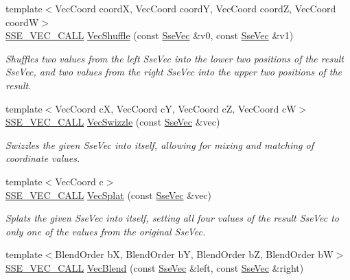 {\bf }\par
\begin{DoxyCompactItemize}
\item 
{\footnotesize template$<$Vec\+Coord coord\+X, Vec\+Coord coord\+Y, Vec\+Coord coord\+Z, Vec\+Coord coord\+W$>$ }\\\hyperlink{ssevec__math__defs_8h_a97454f977a5281455cecacce1e8ba670}{S\+S\+E\+\_\+\+V\+E\+C\+\_\+\+C\+A\+L\+L} \hyperlink{group___s_i_m_d_vec_math_gae8f78c3f4bb12afec4debb58bb9b9643}{Vec\+Shuffle} (const \hyperlink{namespacegfxmath_a0de2243e2b8d0fd46d3af5e036423004}{Sse\+Vec} \&v0, const \hyperlink{namespacegfxmath_a0de2243e2b8d0fd46d3af5e036423004}{Sse\+Vec} \&v1)
\begin{DoxyCompactList}\small\item\em Shuffles two values from the left Sse\+Vec into the lower two positions of the result Sse\+Vec, and two values from the right Sse\+Vec into the upper two positions of the result. \end{DoxyCompactList}\item 
{\footnotesize template$<$Vec\+Coord c\+X, Vec\+Coord c\+Y, Vec\+Coord c\+Z, Vec\+Coord c\+W$>$ }\\\hyperlink{ssevec__math__defs_8h_a97454f977a5281455cecacce1e8ba670}{S\+S\+E\+\_\+\+V\+E\+C\+\_\+\+C\+A\+L\+L} \hyperlink{group___s_i_m_d_vec_math_ga6a071d88e0f11c5a9f5b1283ed8f3ec2}{Vec\+Swizzle} (const \hyperlink{namespacegfxmath_a0de2243e2b8d0fd46d3af5e036423004}{Sse\+Vec} \&vec)
\begin{DoxyCompactList}\small\item\em Swizzles the given Sse\+Vec into itself, allowing for mixing and matching of coordinate values. \end{DoxyCompactList}\item 
{\footnotesize template$<$Vec\+Coord c$>$ }\\\hyperlink{ssevec__math__defs_8h_a97454f977a5281455cecacce1e8ba670}{S\+S\+E\+\_\+\+V\+E\+C\+\_\+\+C\+A\+L\+L} \hyperlink{group___s_i_m_d_vec_math_gae0bf083e25adfecef9647164299dc9be}{Vec\+Splat} (const \hyperlink{namespacegfxmath_a0de2243e2b8d0fd46d3af5e036423004}{Sse\+Vec} \&vec)
\begin{DoxyCompactList}\small\item\em Splats the given Sse\+Vec into itself, setting all four values of the result Sse\+Vec to only one of the values from the original Sse\+Vec. \end{DoxyCompactList}\item 
{\footnotesize template$<$Blend\+Order b\+X, Blend\+Order b\+Y, Blend\+Order b\+Z, Blend\+Order b\+W$>$ }\\\hyperlink{ssevec__math__defs_8h_a97454f977a5281455cecacce1e8ba670}{S\+S\+E\+\_\+\+V\+E\+C\+\_\+\+C\+A\+L\+L} \hyperlink{group___s_i_m_d_vec_math_gabd3f3903877408b4a856e06f97ef7487}{Vec\+Blend} (const \hyperlink{namespacegfxmath_a0de2243e2b8d0fd46d3af5e036423004}{Sse\+Vec} \&left, const \hyperlink{namespacegfxmath_a0de2243e2b8d0fd46d3af5e036423004}{Sse\+Vec} \&right)

\end{DoxyCompactItemize}

